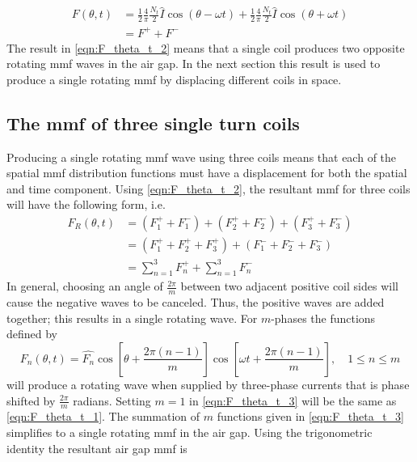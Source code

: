 \begin{equation}
  \label{eqn:F_theta_t_2}
  \begin{aligned}
  F(\theta,t) &= \frac{1}{2}\frac{4}{\pi}\frac{N_t }{2}\hat{I}\cos(\theta - \omega t)
  +\frac{1}{2}\frac{4}{\pi}\frac{N_t }{2}\hat{I}\cos(\theta + \omega t) \\
  &= F^+ + F^-
  \end{aligned}
\end{equation}
The result in \eqref{eqn:F_theta_t_2} means that a single coil produces two opposite rotating mmf waves in the air gap. In the next section this result is used to produce a single rotating mmf by displacing different coils in space. 

\subsection{The mmf of three single turn coils}
Producing a single rotating mmf wave using three coils means that each of the spatial mmf distribution functions must have a displacement for both the spatial and time component. Using \eqref{eqn:F_theta_t_2}, the resultant mmf for three coils will have the following form, i.e.
\begin{equation}
  \begin{aligned}
  F_R(\theta,t) &= (F_{1}^{+}+F_{1}^{-})+(F_{2}^{+}+F_{2}^{-})+(F_{3}^{+}+F_{3}^{-})\\
  &=(F_{1}^{+}+F_{2}^{+}+F_{3}^{+})+(F_{1}^{-}+F_{2}^{-}+F_{3}^{-})\\
  &=\sum_{n=1}^{3}F_{n}^{+}+\sum_{n=1}^{3}F_{n}^{-}
  \end{aligned}
\end{equation}
In general, choosing an angle of $\frac{2\pi}{m}$ between two adjacent positive coil sides will cause the negative waves to be canceled. Thus, the positive waves are added together; this results in a single rotating wave. For $m$-phases the functions defined by
\begin{equation}
  \label{eqn:F_theta_t_3}
  F_n(\theta,t)=\hat{F_n}\cos\left[\theta+\frac{2\pi(n-1)}{m}\right]
  \cos\left[\omega t +\frac{2\pi(n-1)}{m}\right], \quad 1 \leq n \leq m
\end{equation}  
will produce a rotating wave when supplied by three-phase currents that is phase shifted by $\frac{2\pi}{m}$ radians. Setting $m=1$ in \eqref{eqn:F_theta_t_3} will be the same as \eqref{eqn:F_theta_t_1}. The summation of $m$ functions given in \eqref{eqn:F_theta_t_3} simplifies to a single rotating mmf in the air gap. Using the trigonometric identity the resultant air gap mmf is
